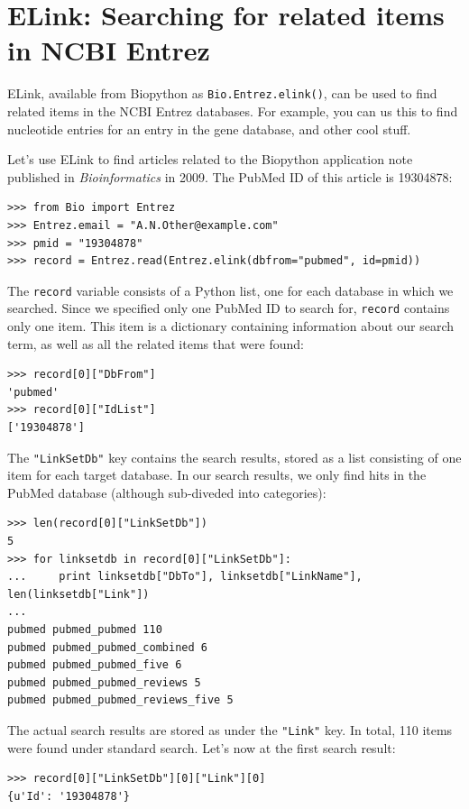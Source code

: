 \documentclass{report}
\begin{document}
\section{ELink: Searching for related items in NCBI Entrez}
\label{sec:elink}

ELink, available from Biopython as \verb+Bio.Entrez.elink()+, can be used to find related items in the NCBI Entrez databases. For example, you can us this to find nucleotide entries for an entry in the gene database,
and other cool stuff.

Let's use ELink to find articles related to the Biopython application note published in \textit{Bioinformatics} in 2009. The PubMed ID of this article is 19304878:

\begin{verbatim}
>>> from Bio import Entrez
>>> Entrez.email = "A.N.Other@example.com"
>>> pmid = "19304878"
>>> record = Entrez.read(Entrez.elink(dbfrom="pubmed", id=pmid))
\end{verbatim}

The \verb+record+ variable consists of a Python list, one for each database in which we searched. Since we specified only one PubMed ID to search for, \verb+record+ contains only one item. This item is a dictionary containing information about our search term, as well as all the related items that were found:

\begin{verbatim}
>>> record[0]["DbFrom"]
'pubmed'
>>> record[0]["IdList"]
['19304878']
\end{verbatim}

The \verb+"LinkSetDb"+ key contains the search results, stored as a list consisting of one item for each target database. In our search results, we only find hits in the PubMed database (although sub-diveded into categories):

\begin{verbatim}
>>> len(record[0]["LinkSetDb"])
5
>>> for linksetdb in record[0]["LinkSetDb"]:
...     print linksetdb["DbTo"], linksetdb["LinkName"], len(linksetdb["Link"])
... 
pubmed pubmed_pubmed 110
pubmed pubmed_pubmed_combined 6
pubmed pubmed_pubmed_five 6
pubmed pubmed_pubmed_reviews 5
pubmed pubmed_pubmed_reviews_five 5
\end{verbatim}

The actual search results are stored as under the \verb+"Link"+ key. In total, 110 items were found under
standard search.
Let's now at the first search result:
\begin{verbatim}
>>> record[0]["LinkSetDb"][0]["Link"][0]
{u'Id': '19304878'}
\end{verbatim}
\end{document}
